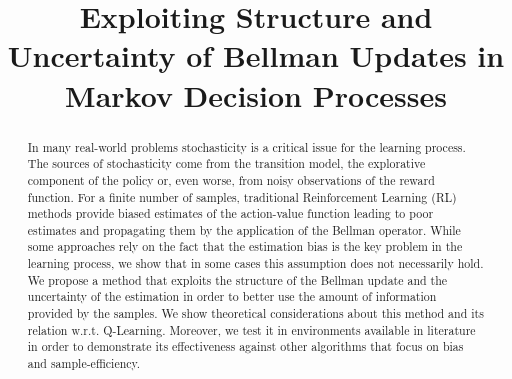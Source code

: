 \documentclass[conference]{IEEEtran}
\begin{document}
\title{Exploiting Structure and Uncertainty of Bellman Updates in Markov Decision Processes}

\author{
}

\maketitle

\begin{abstract}
In many real-world problems stochasticity is a critical issue for the learning process. The sources of stochasticity come from the transition model, the explorative component of the policy or, even worse, from noisy observations of the reward function. For a finite number of samples, traditional Reinforcement Learning (RL) methods provide biased estimates of the action-value function leading to poor estimates and propagating them by the application of the Bellman operator. While some approaches rely on the fact that the estimation bias is the key problem in the learning process, we show that in some cases this assumption does not necessarily hold. We propose a method that exploits the structure of the Bellman update and the uncertainty of the estimation in order to better use the amount of information provided by the samples. We show theoretical considerations about this method and its relation w.r.t. Q-Learning. Moreover, we test it in environments available in literature in order to demonstrate its effectiveness against other algorithms that focus on bias and sample-efficiency.
\end{abstract}



%
\IEEEpeerreviewmaketitle
\end{document}
